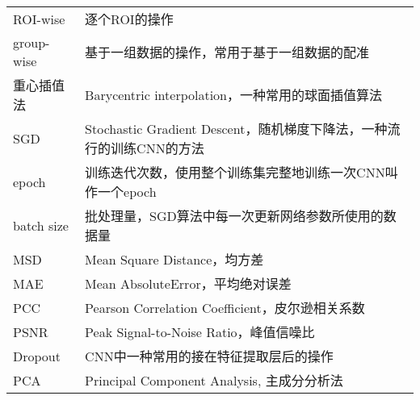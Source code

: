 \begin{center}
\begin{longtable}{>{\raggedleft}p{}  p{}}
            ROI-wise &  逐个ROI的操作 \\
            group-wise & 基于一组数据的操作，常用于基于一组数据的配准 \\
            重心插值法 & Barycentric interpolation，一种常用的球面插值算法 \\
            SGD  & Stochastic Gradient Descent，随机梯度下降法，一种流行的训练CNN的方法 \\
            epoch & 训练迭代次数，使用整个训练集完整地训练一次CNN叫作一个epoch \\
            batch size & 批处理量，SGD算法中每一次更新网络参数所使用的数据量   \\
            MSD  & Mean Square Distance，均方差 \\
            MAE & Mean AbsoluteError，平均绝对误差 \\
            PCC  & Pearson Correlation Coefficient，皮尔逊相关系数 \\
            PSNR & Peak Signal-to-Noise Ratio，峰值信噪比 \\
            Dropout & CNN中一种常用的接在特征提取层后的操作 \\
            PCA & Principal Component Analysis, 主成分分析法 \\
    \end{longtable}
\end{center}
